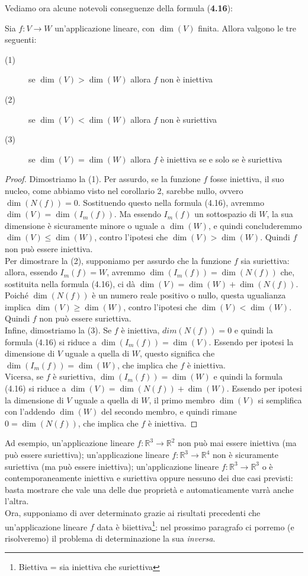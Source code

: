 Vediamo ora alcune notevoli conseguenze della formula (\textbf{4.16}):
\begin{corollario}
  Sia $f:V\to W$ un'applicazione lineare, con $\dim(V)$ finita.
  Allora valgono le tre seguenti:
  \begin{description}
  \item[(1)] se $\dim(V)>\dim(W)$ allora $f$ non è iniettiva
  \item[(2)] se $\dim(V)<\dim(W)$ allora $f$ non è suriettiva
  \item[(3)] se $\dim(V)=\dim(W)$ allora $f$ è iniettiva se e solo se è suriettiva
  \end{description}
\end{corollario}
\begin{proof}
  Dimostriamo la (1). Per assurdo, se la funzione $f$ fosse iniettiva, il suo nucleo, come abbiamo visto nel
  corollario 2, sarebbe nullo, ovvero $\dim(N(f))=0$. Sostituendo questo nella formula (4.16), avremmo
  $\dim(V)=\dim(I_m(f))$. Ma essendo $I_m(f)$ un sottospazio di $W$, la sua dimensione è sicuramente minore o
  uguale a $\dim(W)$, e quindi concluderemmo $\dim(V)\leq \dim(W)$, contro l'ipotesi che $\dim(V)>\dim(W)$. Quindi
  $f$ non può essere iniettiva.\\
  Per dimostrare la (2), supponiamo per assurdo che la funzione $f$ sia suriettiva: allora, essendo $I_m(f)=W$,
  avremmo $\dim(I_m(f))=\dim(N(f))$ che, sostituita nella formula (4.16), ci dà $\dim(V)=\dim(W)+\dim(N(f))$.
  Poiché $\dim(N(f))$ è un numero reale positivo o nullo, questa ugualianza implica $\dim(V)\geq\dim(W)$, contro
  l'ipotesi che $\dim(V)<\dim(W)$. Quindi $f$ non può essere suriettiva.\\
  Infine, dimostriamo la (3). Se $f$ è iniettiva, $dim(N(f))=0$ e quindi la formula (4.16) si riduce a
  $\dim(I_m(f))=\dim(V)$. Essendo per ipotesi la dimensione di $V$ uguale a quella di $W$, questo significa che
  $\dim(I_m(f))=\dim(W)$, che implica che $f$ è iniettiva.\\
  Vicersa, se $f$ è suriettiva, $\dim(I_m(f))=\dim(W)$ e quindi la formula (4.16) si riduce a
  $\dim(V)=\dim(N(f))+\dim(W)$. Essendo per ipotesi la dimensione di $V$ uguale a quella di $W$, il primo
  membro $\dim (V)$ si semplifica con l'addendo $\dim(W)$ del secondo membro, e quindi rimane $0=\dim(N(f))$,
  che implica che $f$ è iniettiva.
\end{proof}
Ad esempio, un'applicazione lineare $f:\mathbb{R}^3\to \mathbb{R}^2$ non può mai essere iniettiva (ma può essere
suriettiva); un'applicazione lineare $f:\mathbb{R}^3\to \mathbb{R}^4$ non è sicuramente suriettiva (ma può essere
iniettiva); un'applicazione lineare $f:\mathbb{R}^3\to \mathbb{R}^3$ o è contemporaneamente iniettiva e suriettiva
oppure nessuno dei due casi previsti: basta mostrare che vale una delle due proprietà e automaticamente varrà
anche l'altra.\\
Ora, supponiamo di aver determinato grazie ai risultati precedenti che un'applicazione lineare $f$ data è
biiettiva\footnote{Biettiva = sia iniettiva che suriettiva}: nel prossimo paragrafo ci porremo (e risolveremo) il
problema di determinazione la sua \textit{inversa}.

